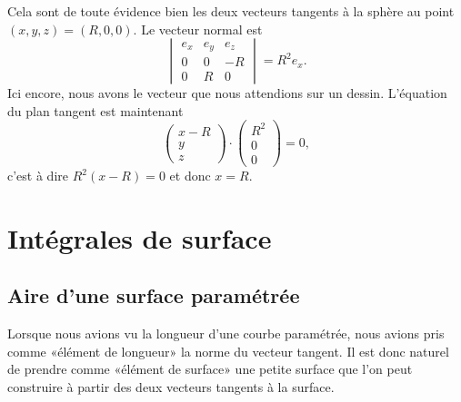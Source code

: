 \begin{example}
    Cela sont de toute évidence bien les deux vecteurs tangents à la sphère au point $(x,y,z)=(R,0,0)$. Le vecteur normal est
    \begin{equation}
        \begin{vmatrix}
            e_x    &   e_y    &   e_z    \\
            0    &   0    &   -R    \\
            0    &   R    &   0
        \end{vmatrix}=R^2e_x.
    \end{equation}
    Ici encore, nous avons le vecteur que nous attendions sur un dessin. L'équation du plan tangent est maintenant
    \begin{equation}
        \begin{pmatrix}
            x-R    \\ 
            y    \\ 
            z    
        \end{pmatrix}\cdot
        \begin{pmatrix}
            R^2    \\ 
            0    \\ 
            0    
        \end{pmatrix}=0,
    \end{equation}
    c'est à dire $R^2(x-R)=0$ et donc $x=R$.
\end{example}

\section{Intégrales de surface}

\subsection{Aire d'une surface paramétrée}

Lorsque nous avions vu la longueur d'une courbe paramétrée, nous avions pris comme «élément de longueur» la norme du vecteur tangent. Il est donc naturel de prendre comme «élément de surface» une petite surface que l'on peut construire à partir des deux vecteurs tangents à la surface.

